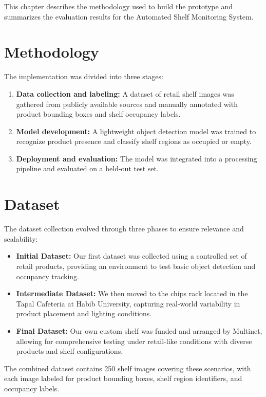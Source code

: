 This chapter describes the methodology used to build the prototype and summarizes the evaluation results for the Automated Shelf Monitoring System.

\section{Methodology}

The implementation was divided into three stages:
\begin{enumerate}
    \item \textbf{Data collection and labeling:} A dataset of retail shelf images was gathered from publicly available sources and manually annotated with product bounding boxes and shelf occupancy labels.
    \item \textbf{Model development:} A lightweight object detection model was trained to recognize product presence and classify shelf regions as occupied or empty.
    \item \textbf{Deployment and evaluation:} The model was integrated into a processing pipeline and evaluated on a held-out test set.
\end{enumerate}

\section{Dataset}

The dataset collection evolved through three phases to ensure relevance and scalability:
\begin{itemize}
    \item \textbf{Initial Dataset:} Our first dataset was collected using a controlled set of retail products, providing an environment to test basic object detection and occupancy tracking.
    \item \textbf{Intermediate Dataset:} We then moved to the chips rack located in the Tapal Cafeteria at Habib University, capturing real-world variability in product placement and lighting conditions.
    \item \textbf{Final Dataset:} Our own custom shelf was funded and arranged by Multinet, allowing for comprehensive testing under retail-like conditions with diverse products and shelf configurations.
\end{itemize}

The combined dataset contains 250 shelf images covering these scenarios, with each image labeled for product bounding boxes, shelf region identifiers, and occupancy labels.

